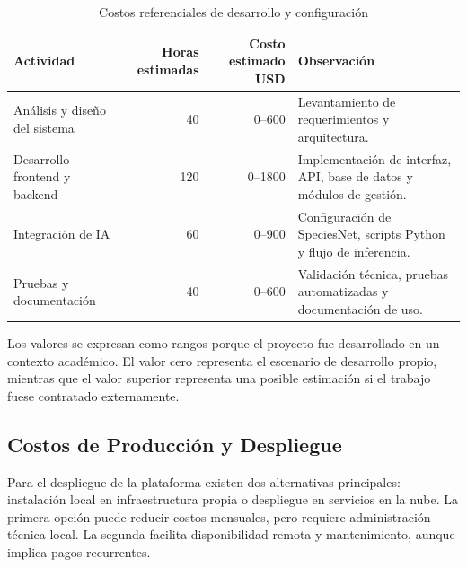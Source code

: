 \begin{table}[H]
\centering
\caption{Costos referenciales de desarrollo y configuración}
\label{tab:costos_desarrollo}
\begin{tabularx}{\textwidth}{lrrX}
\toprule
\textbf{Actividad} & \textbf{Horas estimadas} & \textbf{Costo estimado USD} & \textbf{Observación} \\
\midrule
Análisis y diseño del sistema & 40 & 0--600 & Levantamiento de requerimientos y arquitectura. \\
Desarrollo frontend y backend & 120 & 0--1800 & Implementación de interfaz, API, base de datos y módulos de gestión. \\
Integración de IA & 60 & 0--900 & Configuración de SpeciesNet, scripts Python y flujo de inferencia. \\
Pruebas y documentación & 40 & 0--600 & Validación técnica, pruebas automatizadas y documentación de uso. \\
\bottomrule
\end{tabularx}
\end{table}

Los valores se expresan como rangos porque el proyecto fue desarrollado en un contexto académico. El valor cero representa el escenario de desarrollo propio, mientras que el valor superior representa una posible estimación si el trabajo fuese contratado externamente.

\subsection{Costos de Producción y Despliegue}
\label{subsec:costos_produccion_despliegue}

Para el despliegue de la plataforma existen dos alternativas principales: instalación local en infraestructura propia o despliegue en servicios en la nube. La primera opción puede reducir costos mensuales, pero requiere administración técnica local. La segunda facilita disponibilidad remota y mantenimiento, aunque implica pagos recurrentes.

